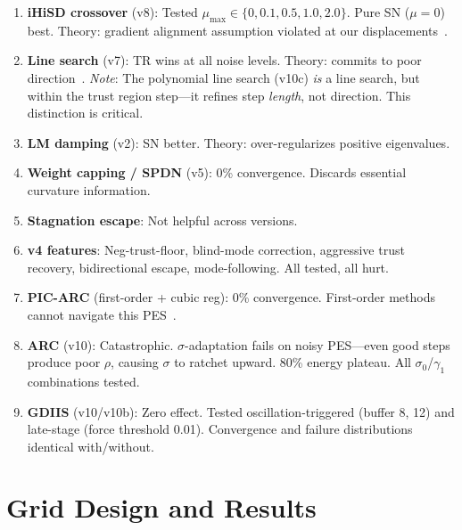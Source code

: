 \documentclass[11pt,a4paper]{article}
\theoremstyle{definition}
\begin{document}
\begin{enumerate}[nosep]
  \item \textbf{iHiSD crossover} (v8): Tested $\mu_\text{max} \in \{0, 0.1,
    0.5, 1.0, 2.0\}$.  Pure SN ($\mu=0$) best.  Theory: gradient alignment
    assumption violated at our displacements~\citep{ihisd}.

  \item \textbf{Line search} (v7): TR wins at all noise levels.  Theory:
    commits to poor direction~\citep{schlegel2011}.
    \emph{Note}: The polynomial line search (v10c) \emph{is} a line search,
    but within the trust region step---it refines step \emph{length}, not
    direction.  This distinction is critical.

  \item \textbf{LM damping} (v2): SN better.  Theory: over-regularizes
    positive eigenvalues.

  \item \textbf{Weight capping / SPDN} (v5): 0\% convergence.  Discards
    essential curvature information.

  \item \textbf{Stagnation escape}: Not helpful across versions.

  \item \textbf{v4 features}: Neg-trust-floor, blind-mode correction,
    aggressive trust recovery, bidirectional escape, mode-following.
    All tested, all hurt.

  \item \textbf{PIC-ARC} (first-order + cubic reg): 0\% convergence.
    First-order methods cannot navigate this PES~\citep{packwood2018}.

  \item \textbf{ARC} (v10): Catastrophic.  $\sigma$-adaptation fails on
    noisy PES---even good steps produce poor $\rho$, causing $\sigma$ to
    ratchet upward.  80\% energy plateau.  All $\sigma_0$/$\gamma_1$
    combinations tested.

  \item \textbf{GDIIS} (v10/v10b): Zero effect.  Tested oscillation-triggered
    (buffer 8, 12) and late-stage (force threshold 0.01).  Convergence and
    failure distributions identical with/without.
\end{enumerate}

\section{Grid Design and Results}
\label{sec:grid}
\end{document}
